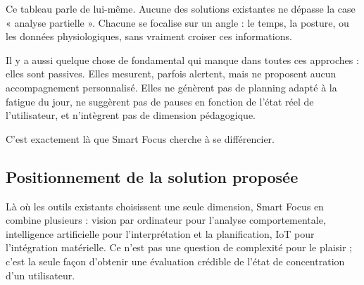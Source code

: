 \begin{table}[H]
\centering
{}
\caption{Comparaison des solutions existantes}
\label{tab:comparaison_solutions_existantes}
\end{table}

Ce tableau parle de lui-même. Aucune des solutions existantes ne dépasse la case « analyse partielle ». Chacune se focalise sur un angle : le temps, la posture, ou les données physiologiques, sans vraiment croiser ces informations.

Il y a aussi quelque chose de fondamental qui manque dans toutes ces approches : elles sont passives. Elles mesurent, parfois alertent, mais ne proposent aucun accompagnement personnalisé. Elles ne génèrent pas de planning adapté à la fatigue du jour, ne suggèrent pas de pauses en fonction de l’état réel de l’utilisateur, et n’intègrent pas de dimension pédagogique.

C’est exactement là que Smart Focus cherche à se différencier.

\subsection{Positionnement de la solution proposée}

Là où les outils existants choisissent une seule dimension, Smart Focus en combine plusieurs : vision par ordinateur pour l’analyse comportementale, intelligence artificielle pour l’interprétation et la planification, IoT pour l’intégration matérielle. Ce n’est pas une question de complexité pour le plaisir ; c’est la seule façon d’obtenir une évaluation crédible de l’état de concentration d’un utilisateur.


